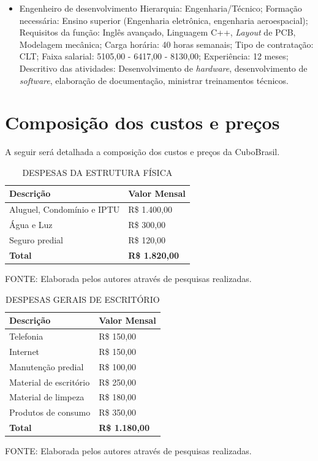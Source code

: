 \documentclass[
	12pt,				%
	openright,			%
	oneside,			%
	a4paper,			%
	english,			%
	french,				%
	spanish,			%
	brazil				%
	]{abntex2}
\begin{document}
\begin{itemize}
		\item Engenheiro de desenvolvimento
		\subitem Hierarquia: Engenharia/Técnico;
		\subitem Formação necessária: Ensino superior (Engenharia eletrônica, engenharia aeroespacial);
		\subitem Requisitos da função: Inglês avançado, Linguagem C++, \textit{Layout} de PCB, Modelagem mecânica;
		\subitem Carga horária: 40 horas semanais;
		\subitem Tipo de contratação: CLT;
		\subitem Faixa salarial: 5105,00 - 6417,00 - 8130,00;
		\subitem Experiência: 12 meses;
		\subitem Descritivo das atividades: Desenvolvimento de \textit{hardware}, desenvolvimento de \textit{software}, elaboração de documentação, ministrar treinamentos técnicos.
		
	\end{itemize}


\section[Composição dos custos e preços]{Composição dos custos e preços}

	A seguir será detalhada a composição dos custos e preços da CuboBrasil.
	
	\begin{table} [th]
	\caption{DESPESAS DA ESTRUTURA FÍSICA}
	\centering
	\begin{tabular}{p{6cm}|p{6cm}}

		\textbf{Descrição} & \textbf{Valor Mensal}\\
		\hline
		Aluguel, Condomínio e IPTU & R\$ 1.400,00 \\
		Água e Luz & R\$ 300,00 \\
		Seguro predial & R\$ 120,00 \\
		\hline
		\textbf{Total} & \textbf{R\$ 1.820,00}			
	\end{tabular}
	
	\begin{small}
		FONTE: Elaborada pelos autores através de pesquisas realizadas.
	\end{small}	
	\end{table}	

	\begin{table} [th]
	\caption{DESPESAS GERAIS DE ESCRITÓRIO}
	\centering
	\begin{tabular}{p{6cm}|p{6cm}}

		\textbf{Descrição} & \textbf{Valor Mensal}\\
		\hline
		Telefonia & R\$ 150,00 \\
		Internet & R\$ 150,00 \\
		Manutenção predial & R\$ 100,00 \\
		Material de escritório & R\$ 250,00 \\
		Material de limpeza & R\$ 180,00 \\
		Produtos de consumo & R\$ 350,00 \\
		\hline
		\textbf{Total} & \textbf{R\$ 1.180,00}			
	\end{tabular}
	
	\begin{small}
		FONTE: Elaborada pelos autores através de pesquisas realizadas.
	\end{small}	
	\end{table}	
\end{document}
